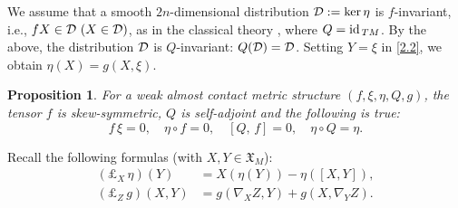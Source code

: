 \documentclass[11pt,a4paper,twoside]{article}
\newtheorem{proposition}{Proposition}%
\begin{document}
{We assume that a smooth $2n$-dimensional distribution ${\cal D}:=\ker\eta$ is ${f}$-invariant, i.e., ${f} X\in{\cal D}\ (X\in{\cal D})$,
as in the classical theory \cite{blair2010riemannian}, where $Q={\rm id}_{\,TM}$.
By the above, the distribution ${\cal D}$ is $Q$-invariant: $Q({\cal D})={\cal D}$.
Setting $Y=\xi$ in \eqref{2.2}, we obtain $\eta(X)=g(X,\xi)$.

\begin{proposition}%
 For a weak almost contact metric structure $({f},\xi,\eta,Q,g)$, the tensor ${f}$ is skew-symmetric, $Q$ is self-adjoint and the following is true:
\[
 {f}\,\xi=0,\quad \eta\circ{f}=0,\quad [Q,\,{f}]=0,\quad \eta\circ Q=\eta.
\]
\end{proposition}

Recall the following formulas (with $X,Y\in\mathfrak{X}_M$):
\begin{align}\label{3.3B}
 (\pounds_{X}\,\eta)(Y) & = X(\eta(Y)) - \eta([X, Y]) ,\\
 \label{3.3C}
 (\pounds_{Z}\,g)(X,Y) & = g(\nabla_X Z, Y) + g(X, \nabla_Y Z).
\end{align}

}
\end{document}
